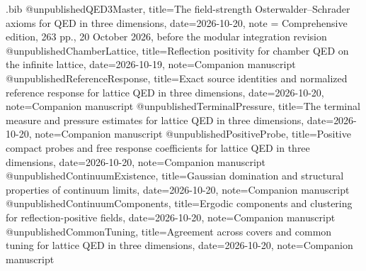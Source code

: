 \begin{filecontents*}[overwrite]{\jobname.bib}
@unpublished{QED3Master,
 title={The field-strength {Osterwalder--Schrader} axioms for {QED} in three dimensions},
 date={2026-10-20}, note = {Comprehensive edition, 263 pp., 20 October 2026, before the modular integration revision}}
@unpublished{ChamberLattice,
 title={Reflection positivity for chamber {QED} on the infinite lattice},
 date={2026-10-19}, note={Companion manuscript}}
@unpublished{ReferenceResponse,
 title={Exact source identities and normalized reference response for lattice {QED} in three dimensions},
 date={2026-10-20}, note={Companion manuscript}}
@unpublished{TerminalPressure,
 title={The terminal measure and pressure estimates for lattice {QED} in three dimensions},
 date={2026-10-20}, note={Companion manuscript}}
@unpublished{PositiveProbe,
 title={Positive compact probes and free response coefficients for lattice {QED} in three dimensions},
 date={2026-10-20}, note={Companion manuscript}}
@unpublished{ContinuumExistence,
 title={Gaussian domination and structural properties of continuum limits},
 date={2026-10-20}, note={Companion manuscript}}
@unpublished{ContinuumComponents,
 title={Ergodic components and clustering for reflection-positive fields},
 date={2026-10-20}, note={Companion manuscript}}
@unpublished{CommonTuning,
 title={Agreement across covers and common tuning for lattice {QED} in three dimensions},
 date={2026-10-20}, note={Companion manuscript}}
\end{filecontents*}
\documentclass[11pt,letterpaper,reqno]{amsart}
\makeatletter
{}[2020/10/01]

\RequirePackage[T1]{fontenc}
\RequirePackage{lmodern}
\RequirePackage{microtype}
\RequirePackage[letterpaper,margin=1in,headheight=15pt]{geometry}
\RequirePackage{amsmath,amsthm,amssymb,mathtools}
\RequirePackage{enumitem}
\RequirePackage{perpage}
\RequirePackage{xcolor}
\RequirePackage[breaklinks=true,colorlinks=true,
  linkcolor=manuscriptred,citecolor=manuscriptblue,urlcolor=manuscriptmagenta]{hyperref}
\RequirePackage{cleveref}

